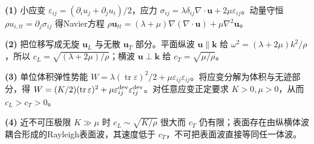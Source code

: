 \par\noindent\textbf{(1)} 小应变 \(\varepsilon_{ij}=(\partial_iu_j+\partial_ju_i)/2\)，应力 \(\sigma_{ij}=\lambda\delta_{ij}\nabla\cdot\boldsymbol u+2\mu\varepsilon_{ij}\)。动量守恒 \(\rho u_{i,tt}=\partial_j\sigma_{ij}\) 得Navier方程 \(\rho\boldsymbol u_{tt}=(\lambda+\mu)\nabla(\nabla\cdot\boldsymbol u)+\mu\nabla^2\boldsymbol u\)。
\par\noindent\textbf{(2)} 把位移写成无旋 \(\boldsymbol u_L\) 与无散 \(\boldsymbol u_T\) 部分。平面纵波 \(\boldsymbol u\parallel\boldsymbol k\) 给 \(\omega^2=(\lambda+2\mu)k^2/\rho\)，所以 \(c_L=\sqrt{(\lambda+2\mu)/\rho}\)；横波 \(\boldsymbol u\perp\boldsymbol k\) 给 \(c_T=\sqrt{\mu/\rho}\)。
\par\noindent\textbf{(3)} 单位体积弹性势能 \(W=\lambda(\operatorname{tr}\varepsilon)^2/2+\mu\varepsilon_{ij}\varepsilon_{ij}\)。将应变分解为体积与无迹部分，得 \(W=(K/2)(\operatorname{tr}\varepsilon)^2+\mu\varepsilon_{ij}^{\rm dev}\varepsilon_{ij}^{\rm dev}\)。对任意应变正定要求 \(K>0,\mu>0\)，从而 \(c_L>c_T>0\)。
\par\noindent\textbf{(4)} 近不可压极限 \(K\gg\mu\) 时 \(c_L\sim\sqrt{K/\rho}\) 很大而 \(c_T\) 仍有限；表面存在由纵横体波耦合形成的Rayleigh表面波，其速度低于 \(c_T\)，不可把表面波直接等同任一体波。

